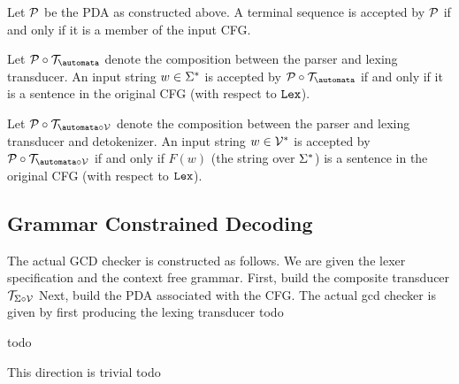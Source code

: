 \begin{definition}[Lexer]
\begin{theorem} 
    \label{thm:PDAEquivCFG}
    Let $\mathcal{P}$ be the PDA as constructed above. A terminal sequence is accepted by $\mathcal{P}$ if and only if it is a member of the input CFG.
\end{theorem}

\begin{theorem} 
    \label{thm:PDALexerEquivCFGLang}
    Let $\pushdown \circ \transducer_{\automata}$ denote the composition between the parser and lexing transducer.
    An input string $w \in \Sigma^{*}$ is accepted by $\pushdown \circ \transducer_{\automata}$ if and only if it is a sentence in the original CFG (with respect to $\mathtt{Lex}$).
\end{theorem}

\begin{theorem} 
    \label{thm:PDALexerDetokenizerEquivCFGLang}
    Let $\pushdown \circ \transducer_{\automata \circ \vocab}$ denote the composition between the parser and lexing transducer and detokenizer.
    An input string $w \in \mathcal{V}^{*}$ is accepted by $\pushdown \circ \transducer_{\automata \circ \vocab}$ if and only if $F(w)$ (the string over $\Sigma^{*}$) is a sentence in the original CFG (with respect to $\mathtt{Lex}$).
\end{theorem}

\subsection{Grammar Constrained Decoding}
\begin{definition}[GCDChecker]
    \label{def:GCDChecker}
    The actual GCD checker is constructed as follows. We are given the lexer specification and the context free grammar.
    First, build the composite transducer $\mathcal{T}_{\Sigma \circ \mathcal{V}}$
    Next, build the PDA associated with the CFG.
    The actual gcd checker is given by first producing the lexing transducer
    todo
\end{definition}

\begin{theorem}
    \label{thm:LangGrammarSubsetGCDChecker}
    todo 
\end{theorem}

\begin{theorem}
    \label{thm:LangGCDCheckerSubsetGrammar}
    This direction is trivial 
    todo 
\end{theorem}


\end{definition}
